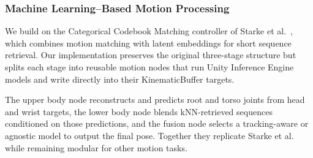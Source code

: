 \subsubsection{Machine Learning--Based Motion Processing}
We build on the Categorical Codebook Matching controller of Starke et al.~\cite{starke2024categorical}, which combines motion matching with latent embeddings for short sequence retrieval.
Our implementation preserves the original three-stage structure but splits each stage into reusable motion nodes that run Unity Inference Engine models and write directly into their KinematicBuffer targets.

The upper body node reconstructs and predicts root and torso joints from head and wrist targets, the lower body node blends kNN-retrieved sequences conditioned on those predictions, and the fusion node selects a tracking-aware or agnostic model to output the final pose.
Together they replicate Starke et al.~\cite{starke2024categorical} while remaining modular for other motion tasks.